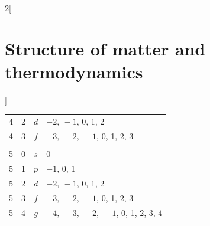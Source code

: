 \documentclass[../../../main.tex]{subfiles}
\begin{document}
\begin{multicols}{2}[\section{Structure of matter and thermodynamics}]
\begin{center}
\begin{minipage}{\linewidth}
\begin{tabular}{cccl}
                4   & 2      & $d$             & $-2,\ -1$, 0, 1, 2                 \\
                4   & 3      & $f$             & $-3,\ -2,\ -1$, 0, 1, 2, 3         \\
                    &        &                 &                                    \\
                5   & 0      & $s$             & 0                                  \\
                5   & 1      & $p$             & $-1$, 0, 1                         \\
                5   & 2      & $d$             & $-2,\ -1$, 0, 1, 2                 \\
                5   & 3      & $f$             & $-3,\ -2,\ -1$, 0, 1, 2, 3         \\
                5   & 4      & $g$             & $-4,\ -3,\ -2,\ -1$, 0, 1, 2, 3, 4 \\
                \hline
                \hline
            \end{tabular}
        \end{minipage}
    \end{center}

\end{multicols}
\end{document}
